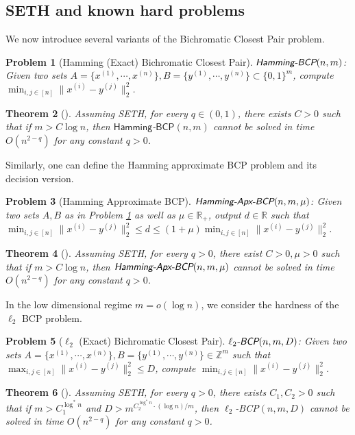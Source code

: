 \documentclass[10pt,a4paper]{article}
\newtheorem{theorem}{Theorem}
\newtheorem{problem}[theorem]{Problem}
\theoremstyle{remark}
\numberwithin{equation}{section}
\numberwithin{theorem}{section}
\newcommand{\R}{\ensuremath{\mathbb{R}}}
\newcommand{\Z}{\ensuremath{\mathbb{Z}}}
\begin{document}
\subsection{SETH and known hard problems}
\label{sec:hardproblems}





















We now introduce several variants of the Bichromatic Closest Pair problem. 
\begin{problem}[Hamming (Exact) Bichromatic Closest Pair]
\label{prob:HBCP}
$\emph{\textsf{Hamming-BCP}}(n, m)$: Given two sets $A = \{x^{(1)}, \cdots, x^{(n)}\}, B = \{y^{(1)}, \cdots, y^{(n)}\} \subset \{0, 1\}^m$, compute $\min_{i, j \in [n]} \|x^{(i)} - y^{(j)}\|_2^2$.
\end{problem}
\begin{theorem}[\cite{AW15}]
Assuming SETH, for every $q \in (0, 1)$, there exists $C > 0$ such that if $m > C\log n$, then $\mathsf{Hamming}$-$\mathsf{BCP}(n, m)$ cannot be solved in time $O(n^{2-q})$ for any constant $q>0$.
\end{theorem}

Similarly, one can define the Hamming approximate BCP problem and its decision version.
\begin{problem}[Hamming Approximate BCP]
\label{prob:HABCP}
$\emph{\textsf{Hamming-Apx-BCP}}(n, m, \mu)$:
Given two sets $A, B$ as in Problem \ref{prob:HBCP} as well as $\mu \in \R_+$, output $d \in \R$ such that $\min_{i, j \in [n]} \|x^{(i)} - y^{(j)}\|_2^2 \le d \le (1 + \mu) \min_{i, j \in [n]} \|x^{(i)} - y^{(j)}\|_2^2$.
\end{problem}
\begin{theorem}[\cite{Rub18}] \label{bcp1}
Assuming SETH, for every $q > 0$, there exist $C > 0, \mu > 0$ such that if $m > C\log n$, then $\emph{\textsf{Hamming-Apx-BCP}}(n, m, \mu)$ cannot be solved in time $O(n^{2-q})$ for any constant $q>0$.
\end{theorem}

In the low dimensional regime $m = o(\log n)$, we consider the hardness of the $\ell_2$ BCP problem.
\begin{problem}[$\ell_2$ (Exact) Bichromatic Closest Pair]
$\ell_2\emph{\textsf{-BCP}}(n, m, D)$: Given two sets $A = \{x^{(1)}, \cdots, x^{(n)}\}, B = \{y^{(1)}, \cdots, y^{(n)}\} \in \Z^m$ such that $\max_{i, j \in [n]} \|x^{(i)} - y^{(j)}\|_2^2 \le D$, compute $\min_{i, j \in [n]} \|x^{(i)} - y^{(j)}\|_2^2$.
\end{problem}
\begin{theorem}[\cite{ChenMinIP}] \label{bcp2}
Assuming SETH, for every $q > 0$, there exists $C_1, C_2 > 0$ such that if $m > C_1^{\log^* n}$ and $D > m^{C_2^{\log^* n} \cdot (\log n)/m}$, then $\ell_2$\emph{\textsf{-BCP}}$(n, m, D)$ cannot be solved in time $O(n^{2-q})$ for any constant $q>0$.
\end{theorem}
\end{document}
